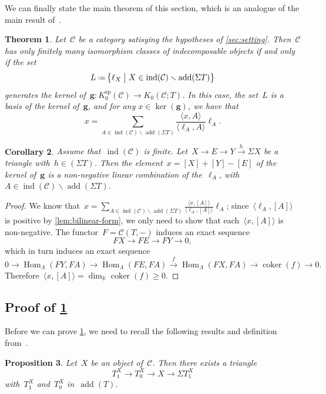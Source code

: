 \documentclass{amsart}
\newtheorem{theorem}{Theorem}[section]
\newtheorem{corollary}[theorem]{Corollary}
\newtheorem{proposition}[theorem]{Proposition}
\theoremstyle{definition}
\renewcommand{\b}[1]{{\boldsymbol{#1}}} %
\newcommand{\bigset}[2]{\big\{ #1 \;\big|\; #2 \big\}} %
\newcommand{\ssm}{\smallsetminus} %
\newcommand{\eqdef}{\mbox{\,\raisebox{0.2ex}{\scriptsize\ensuremath{\mathrm:}}\ensuremath{=}\,}} %
\newcommand{\field}{\mathbb{K}}
\newcommand{\cat}{\mathcal{C}}
\newcommand{\Hom}[1]{\operatorname{Hom}_{#1}}
\newcommand{\susp}{\Sigma}
\newcommand{\add}{\operatorname{add}}
\newcommand{\spl}{\operatorname{sp}}
\newcommand{\Ksp}{K_0^{\spl}}
\newcommand{\ind}{\operatorname{ind}}
\newcommand{\coker}{\operatorname{coker}}
\begin{document}
We can finally state the main theorem of this section, which is an analogue of the main result of~\cite{Auslander1984}.

\begin{theorem}
\label{thm:relations-g-vecteurs}
Let~$\cat$ be a category satisying the hypotheses of \cref{sec:setting}. Then~$\cat$ has only finitely many isomorphism classes of indecomposable objects if and only if the set
\[
L \eqdef \bigset{\ell_X}{X \in \ind(\cat) \ssm \add(\susp T)}
\]
generates the kernel of~$\b{g}:\Ksp(\cat) \to K_0(\cat ; T)$. 
In this case, the set~$L$ is a basis of the kernel of~$\b{g}$, and for any $x \in \ker(\b{g})$, we have that
\[
x= \sum_{A \in \ind(\cat) \ssm \add(\susp T)} \frac{\langle x, A \rangle}{\langle \ell_A, A \rangle} \ell_A.
\]
\end{theorem}

\begin{corollary}
\label{coro:meshes positively generate cluster cats}
Assume that~$\ind(\cat)$ is finite. Let~$X\xrightarrow{} E \xrightarrow{} Y \xrightarrow{h} \susp X$ be a triangle with~$h \in (\susp T)$. Then the element~$x=[X]+[Y]-[E]$ of the kernel of~$\b{g}$ is a non-negative linear combination of the~$\ell_A$, with~$A \in \ind(\cat)\ssm \add(\susp T)$.
\end{corollary}

\begin{proof}
We know that~$x=\sum_{A \in \ind(\cat) \ssm \add(\susp T)} \frac{\langle x, [A] \rangle}{\langle \ell_A, [A] \rangle} \ell_A$; since~$\langle \ell_A, [A] \rangle$ is positive by \cref{lem:bilinear-form}, we only need to show that each~$\langle x, [A] \rangle$ is non-negative. 
The functor~$F=\cat(T,-)$ induces an exact sequence
\[
FX \to FE \to FY \to 0,
\]
which in turn induces an exact sequence
\[
0\to \Hom{\Lambda}(FY, FA) \to \Hom{\Lambda}(FE, FA) \xrightarrow{f} \Hom{\Lambda}(FX, FA) \to \coker(f) \to 0.
\]
Therefore~$\langle x, [A] \rangle = \dim_{\field} \coker(f) \ge 0$.
\end{proof}


\subsection{Proof of \cref{thm:relations-g-vecteurs}}

Before we can prove \cref{thm:relations-g-vecteurs}, we need to recall the following results and definition from~\cite{DehyKeller,Palu}.

\begin{proposition}
Let~$X$ be an object of~$\cat$. Then there exists a triangle
\[
T_1^X \to T_0^X \to X \to \susp T_1^X
\]
with~$T_1^X$ and~$T_0^X$ in~$\add(T)$.
\end{proposition}
\end{document}

